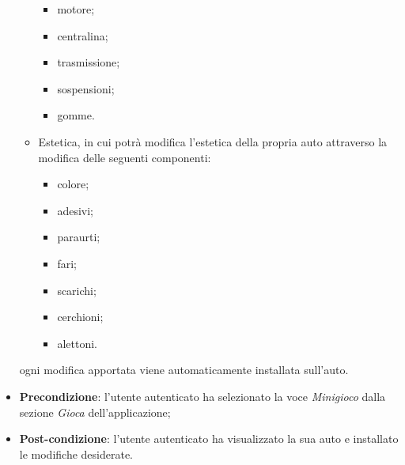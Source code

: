 \begin{itemize}
\begin{itemize}
		\begin{itemize}
			\item motore;
			\item centralina;
			\item trasmissione;
			\item sospensioni;
			\item gomme.
		\end{itemize}
		\item Estetica, in cui potrà modifica l'estetica della propria auto attraverso la modifica delle seguenti componenti:
		\begin{itemize}
			\item colore;
			\item adesivi;
			\item paraurti;
			\item fari;
			\item scarichi;
			\item cerchioni;
			\item alettoni. 
		\end{itemize}
	\end{itemize}
	ogni modifica apportata viene automaticamente installata sull'auto.
	\item \textbf{Precondizione}: l'utente autenticato ha selezionato la voce \textit{Minigioco} dalla sezione \textit{Gioca} dell'applicazione;
	\item \textbf{Post-condizione}: l'utente autenticato ha visualizzato la sua auto e installato le modifiche desiderate. 
\end{itemize}
\newpage
